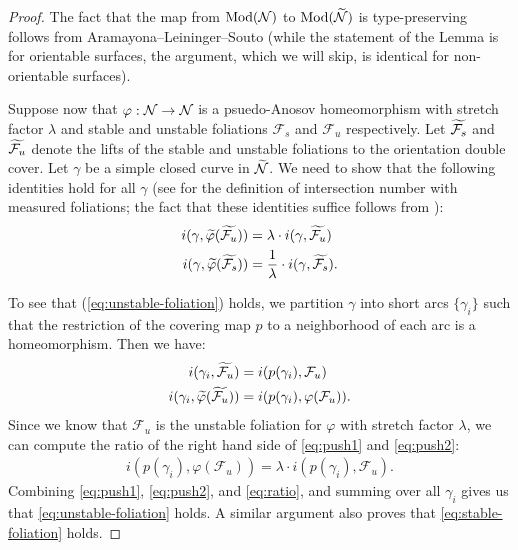 \begin{proof}
  The fact that the map from $\operatorname{Mod}(\mathcal{N})$ to $\operatorname{Mod}(\widetilde{\mathcal{N}})$ is type-preserving follows from Aramayona--Leininger--Souto \cite[Lemma 10]{aramayona2009injections} (while the statement of the Lemma is for orientable surfaces, the argument, which we will skip, is identical for non-orientable surfaces).

  Suppose now that $\varphi:\mathcal{N}\rightarrow\mathcal{N}$ is a psuedo-Anosov homeomorphism with stretch factor $\lambda$ and stable and unstable foliations $\mathcal{F}_s$ and $\mathcal{F}_u$ respectively.
  Let $\widetilde{\mathcal{F}_s}$ and $\widetilde{\mathcal{F}_u}$ denote the lifts of the stable and unstable foliations to the orientation double cover.  Let $\gamma$ be a simple closed curve in $\widetilde{\mathcal{N}}$.
  We need to show that the following identities hold for all $\gamma$ (see \cite[Expos\'e 5]{FLP} for the definition of intersection number with measured foliations; the fact that these identities suffice follows from \cite[Lemma 9.15]{FLP}):
  \begin{align}
      \label{eq:unstable-foliation}
      i(\gamma, \widetilde{\varphi}(\widetilde{\mathcal{F}_u})) &= \lambda \cdot i(\gamma, \widetilde{\mathcal{F}_u}) \\
      \label{eq:stable-foliation}
      i(\gamma, \widetilde{\varphi}(\widetilde{\mathcal{F}_s})) &= \frac{1}{\lambda} \cdot i(\gamma, \widetilde{\mathcal{F}_s}).
  \end{align}

  To see that (\ref{eq:unstable-foliation}) holds, we partition $\gamma$ into short arcs $\{\gamma_i\}$ such that the restriction of the covering map $p$ to a neighborhood of each arc is a homeomorphism.
  Then we have:
  \begin{align}
  \label{eq:push1}
    i(\gamma_i, \widetilde{\mathcal{F}_u}) &= i(p(\gamma_i), \mathcal{F}_u) \\
  \label{eq:push2}
    i(\gamma_i, \widetilde{\varphi}(\widetilde{\mathcal{F}_u})) &= i(p(\gamma_i), \varphi(\mathcal{F}_u)).
  \end{align}
  Since we know that $\mathcal{F}_u$ is the unstable foliation for $\varphi$ with stretch factor $\lambda$, we can compute the ratio of the right hand side of \eqref{eq:push1} and \eqref{eq:push2}:
  \begin{align}
      \label{eq:ratio}
      i(p(\gamma_i), \varphi(\mathcal{F}_u)) = \lambda \cdot i(p(\gamma_i), \mathcal{F}_u).
  \end{align}
  Combining \eqref{eq:push1}, \eqref{eq:push2}, and \eqref{eq:ratio}, and summing over all $\gamma_i$ gives us that \eqref{eq:unstable-foliation} holds. A similar argument also proves that \eqref{eq:stable-foliation} holds.
\end{proof}



